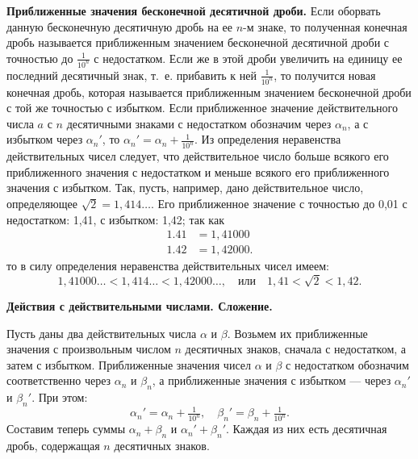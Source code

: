 \documentclass[oneside]{book}
\begin{document}
\textbf{Приближенные значения бесконечной десятичной дроби.}
Если оборвать данную бесконечную десятичную дробь на ее $n$-м знаке, то полученная конечная дробь называется приближенным значением бесконечной десятичной дроби с точностью до $\tfrac1{10^n}$ с недостатком.
Если же в этой дроби увеличить на единицу ее последний десятичный знак, т.~е.
прибавить к ней $\tfrac1{10^n}$, то получится новая конечная дробь, которая называется приближенным значением бесконечной дроби с той же точностью с избытком.
Если приближенное значение действительного числа $a$ с $n$ десятичными знаками с недостатком обозначим через $\alpha_n$, а с избытком через  $\alpha_n'$, то  $\alpha_n'=\alpha_n+\tfrac1{10^n}$.
Из определения неравенства действительных чисел следует, что действительное число больше всякого его приближенного значения с недостатком и меньше всякого его приближенного значения с избытком.
Так, пусть, например, дано действительное число, определяющее  $\sqrt{2}  = 1{,}414\dots$.
Его приближенное значение с точностью до 0,01 с недостатком:
1,41, с избытком:
1,42;
так как
\begin{align*}
1.41 &= 1{,}41000
\\
1.42 &= 1{,}42000.
\end{align*}
то в силу определения неравенства действительных чисел имеем:
\[1,41000\ldots
< 1,414\ldots
< 1,42000\ldots,
\quad\text{или}\quad
1,41 <  \sqrt{2}  < 1,42.\]

\textbf{Действия с действительными числами.
Сложение.}


Пусть даны два действительных числа $\alpha$ и $\beta$.
Возьмем их приближенные значения с произвольным числом $n$ десятичных знаков, сначала с недостатком, а затем с избытком.
Приближенные значения чисел $\alpha$ и $\beta$ с недостатком обозначим соответственно через $\alpha_n$ и $\beta_n$, а приближенные значения с избытком — через $\alpha_n'$ и $\beta_n'$.
При этом:
\[\alpha_n'=\alpha_n +\tfrac1{10^n},
\quad
 \beta_n'=\beta_n +\tfrac1{10^n}.
\]
Составим теперь суммы $\alpha_n+\beta_n$ и $\alpha_n'+ \beta_n'$.
Каждая из них есть десятичная дробь, содержащая $n$ десятичных знаков.
\end{document}
